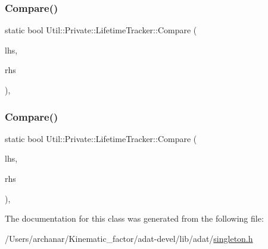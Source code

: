 \subsubsection{\texorpdfstring{Compare()}{Compare()}\hspace{0.1cm}{\footnotesize\ttfamily [2/3]}}
{\footnotesize\ttfamily static bool Util\+::\+Private\+::\+Lifetime\+Tracker\+::\+Compare (\begin{DoxyParamCaption}\item[{const \mbox{\hyperlink{classUtil_1_1Private_1_1LifetimeTracker}{Lifetime\+Tracker}} $\ast$}]{lhs,  }\item[{const \mbox{\hyperlink{classUtil_1_1Private_1_1LifetimeTracker}{Lifetime\+Tracker}} $\ast$}]{rhs }\end{DoxyParamCaption})\hspace{0.3cm}{\ttfamily [inline]}, {\ttfamily [static]}}

\mbox{\label{classUtil_1_1Private_1_1LifetimeTracker_aa24d4865c53c4f962183ce31276efd7c}} 
\subsubsection{\texorpdfstring{Compare()}{Compare()}\hspace{0.1cm}{\footnotesize\ttfamily [3/3]}}
{\footnotesize\ttfamily static bool Util\+::\+Private\+::\+Lifetime\+Tracker\+::\+Compare (\begin{DoxyParamCaption}\item[{const \mbox{\hyperlink{classUtil_1_1Private_1_1LifetimeTracker}{Lifetime\+Tracker}} $\ast$}]{lhs,  }\item[{const \mbox{\hyperlink{classUtil_1_1Private_1_1LifetimeTracker}{Lifetime\+Tracker}} $\ast$}]{rhs }\end{DoxyParamCaption})\hspace{0.3cm}{\ttfamily [inline]}, {\ttfamily [static]}}



The documentation for this class was generated from the following file\+:\begin{DoxyCompactItemize}
\item 
/\+Users/archanar/\+Kinematic\+\_\+factor/adat-\/devel/lib/adat/\mbox{\hyperlink{adat-devel_2lib_2adat_2singleton_8h}{singleton.\+h}}\end{DoxyCompactItemize}
